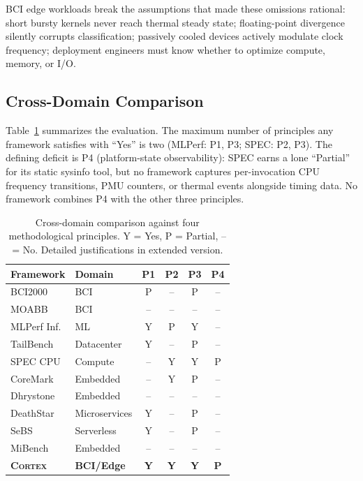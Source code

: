 \documentclass[sigplan,10pt]{acmart}
\newcommand{\cortex}{\textsc{Cortex}}
\begin{document}
BCI edge workloads break the assumptions that made these omissions rational: short bursty kernels never reach thermal steady state; floating-point divergence silently corrupts classification; passively cooled devices actively modulate clock frequency; deployment engineers must know whether to optimize compute, memory, or I/O.

\subsection{Cross-Domain Comparison}

Table~\ref{tab:comparison} summarizes the evaluation. The maximum number of principles any framework satisfies with ``Yes'' is two (MLPerf: P1, P3; SPEC: P2, P3). The defining deficit is P4 (platform-state observability): SPEC earns a lone ``Partial'' for its static sysinfo tool, but no framework captures per-invocation CPU frequency transitions, PMU counters, or thermal events alongside timing data. No framework combines P4 with the other three principles.

\begin{table}[t]
\centering
\caption{Cross-domain comparison against four methodological principles. Y = Yes, P = Partial, -- = No. Detailed justifications in extended version.}
\label{tab:comparison}
\small
\begin{tabular}{@{}llcccc@{}}
\toprule
Framework & Domain & P1 & P2 & P3 & P4 \\
\midrule
BCI2000 & BCI & P & -- & P & -- \\
MOABB & BCI & -- & -- & -- & -- \\
MLPerf Inf. & ML & Y & P & Y & -- \\
TailBench & Datacenter & Y & -- & P & -- \\
SPEC CPU & Compute & -- & Y & Y & P \\
CoreMark & Embedded & -- & Y & P & -- \\
Dhrystone & Embedded & -- & -- & -- & -- \\
DeathStar & Microservices & Y & -- & P & -- \\
SeBS & Serverless & Y & -- & P & -- \\
MiBench & Embedded & -- & -- & -- & -- \\
\midrule
\textbf{\cortex{}} & \textbf{BCI/Edge} & \textbf{Y} & \textbf{Y} & \textbf{Y} & \textbf{P} \\
\bottomrule
\end{tabular}
\end{table}
\end{document}
